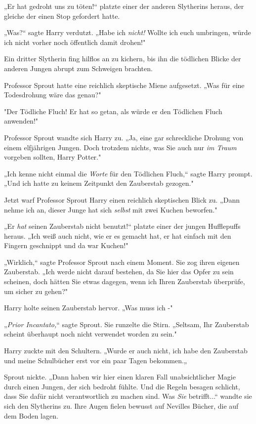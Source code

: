 {„Er hat gedroht uns zu töten!“ platzte einer der anderen Slytherins heraus, der gleiche der einen Stop gefordert hatte.

„Was?“ sagte Harry verdutzt. „Habe ich \emph{nicht!} Wollte ich euch umbringen, würde ich nicht vorher noch öffentlich damit drohen!"

Ein dritter Slytherin fing hilflos an zu kichern, bis ihn die tödlichen Blicke der anderen Jungen abrupt zum Schweigen brachten.

Professor Sprout hatte eine reichlich skeptische Miene aufgesetzt. „Was für eine Todesdrohung wäre das genau?"

"Der Tödliche Fluch! Er hat so getan, als würde er den Tödlichen Fluch anwenden!"

Professor Sprout wandte sich Harry zu. „Ja, eine gar schreckliche Drohung von einem elfjährigen Jungen. Doch trotzdem nichts, was Sie auch nur \emph{im Traum} vorgeben sollten, Harry Potter."

„Ich kenne nicht einmal die \emph{Worte} für den Tödlichen Fluch,“ sagte Harry prompt. „Und ich hatte zu keinem Zeitpunkt den Zauberstab gezogen."

Jetzt warf Professor Sprout Harry einen reichlich skeptischen Blick zu. „Dann nehme ich an, dieser Junge hat sich \emph{selbst} mit zwei Kuchen beworfen."

„Er \emph{hat} seinen Zauberstab nicht benutzt!“ platzte einer der jungen Hufflepuffs heraus. „Ich weiß auch nicht, wie er es gemacht hat, er hat einfach mit den Fingern geschnippt und da war Kuchen!"

„Wirklich,“ sagte Professor Sprout nach einem Moment. Sie zog ihren eigenen Zauberstab. „Ich werde nicht darauf bestehen, da Sie hier das Opfer zu sein scheinen, doch hätten Sie etwas dagegen, wenn ich Ihren Zauberstab überprüfe, um sicher zu gehen?"

Harry holte seinen Zauberstab hervor. „Was muss ich -"

„\emph{Prior Incantato,}“ sagte Sprout. Sie runzelte die Stirn. „Seltsam, Ihr Zauberstab scheint überhaupt noch nicht verwendet worden zu sein."

Harry zuckte mit den Schultern. „Wurde er auch nicht, ich habe den Zauberstab und meine Schulbücher erst vor ein paar Tagen bekommen.„

Sprout nickte. „Dann haben wir hier einen klaren Fall unabsichtlicher Magie durch einen Jungen, der sich bedroht fühlte. Und die Regeln besagen schlicht, dass Sie dafür nicht verantwortlich zu machen sind. Was \emph{Sie} betrifft...“ wandte sie sich den Slytherins zu. Ihre Augen fielen bewusst auf Nevilles Bücher, die auf dem Boden lagen.

}
